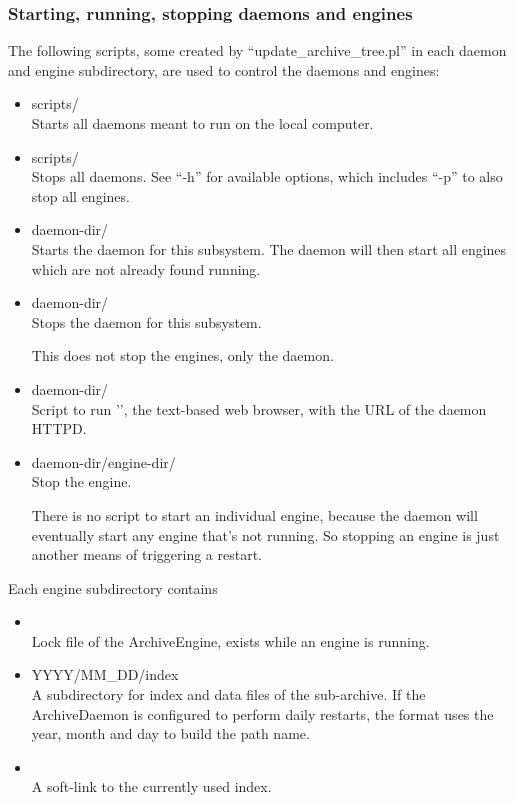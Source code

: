 \subsubsection{Starting, running, stopping daemons and engines}
The following scripts, some created by ``update\_archive\_tree.pl'' in
each daemon and engine subdirectory, are used to control the daemons
and engines:
\begin{itemize}
\item scripts/ \\
      Starts all daemons meant to run on the local computer.
\item scripts/ \\
      Stops all daemons. See ``-h'' for available options, which
      includes ``-p'' to also stop all engines.
\item daemon-dir/ \\
      Starts the daemon for this subsystem.
      The daemon will then start all engines which are not already
      found running.
\item daemon-dir/ \\
      Stops the daemon for this subsystem.

      \NOTE This does not stop the engines, only the daemon.
\item daemon-dir/ \\
      Script to run '', the text-based web browser, with
      the URL of the daemon HTTPD.
\item daemon-dir/engine-dir/ \\
      Stop the engine.

      \NOTE There is no script to start an individual engine, because the
      daemon will eventually start any engine that's not running.
      So stopping an engine is just another means of triggering a
      restart.
\end{itemize}

\noindent Each engine subdirectory contains
\begin{itemize}
\item {}\\
  Lock file of the ArchiveEngine, exists while an engine is running.
\item YYYY/MM\_DD/index \\
  A subdirectory for index and data files of the sub-archive.  If the
  ArchiveDaemon is configured to perform daily restarts, the format
  uses the year, month and day to build the path name.
\item {} \\
  A soft-link to the currently used index.
\end{itemize}

